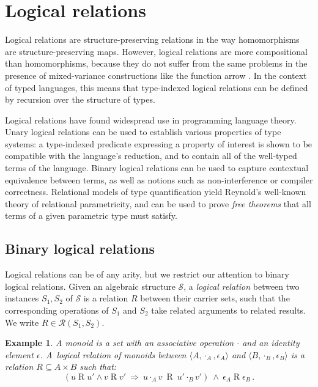 \documentclass[draft,11pt]{report}
\newtheorem{example}[theorem]{Example}
\theoremstyle{definition}
\begin{document}

\section{Logical relations} %

Logical relations are structure-preserving relations
in the way homomorphisms are structure-preserving maps.
However,
logical relations are more compositional than homomorphisms,
because they do not suffer from the same problems
in the presence of mixed-variance constructions
like the function arrow %
\citep{lrp}.
In the context of typed languages,
this means that type-indexed logical relations
can be defined by recursion over the structure of types.

Logical relations have found widespread use in programming language theory.
Unary logical relations can be used to establish
various properties of type systems:
a type-indexed predicate expressing a property of interest
is shown to be compatible with the language's reduction,
and to contain all of the well-typed terms of the language.
Binary logical relations can be used to capture
contextual equivalence between terms,
as well as notions such as non-interference or compiler correctness.
Relational models of type quantification yield
Reynold's well-known theory of relational parametricity,
and can be used to prove \emph{free theorems} that
all terms of a given parametric type must satisfy.

\subsection{Binary logical relations}

Logical relations can be of any arity,
but
we restrict our attention to
binary logical relations.
Given an algebraic structure $\mathcal{S}$,
a \emph{logical relation}
between two instances $S_1, S_2$ of $\mathcal{S}$
is a relation $R$
between their carrier sets,
such that the corresponding operations of $S_1$ and $S_2$
take related arguments to related results.
We write $R \in \mathcal{R}(S_1, S_2)$.

\begin{example}%
\label{ex:monoid}
A monoid is a set with
an associative operation $\cdot$ and
an identity element $\epsilon$.
A~\emph{logical relation of monoids} between
$\langle A, \cdot_A, \epsilon_A \rangle$ and
$\langle B, \cdot_B, \epsilon_B \rangle$
is a relation $R \subseteq A \times B$
such that:
\begin{equation}
\label{eqn:monoidrel}
(u \mathrel{R} u' \wedge v \mathrel{R} v' \: \Rightarrow \:
 u \cdot_A v \: \mathrel{R} \: u' \cdot_B v')
\: \wedge \:
\epsilon_A \mathrel{R} \epsilon_B \,.
\end{equation}
\end{example}
\end{document}
